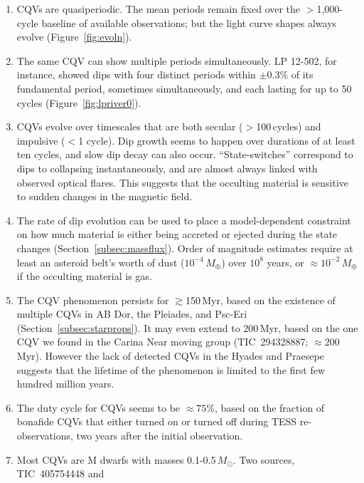 \documentclass[11pt,twocolumn,tighten]{aastex63}
\begin{document}
\begin{enumerate}[leftmargin=*]
    \item CQVs are quasiperiodic.  The mean periods remain fixed over
      the $>$1{,}000-cycle baseline of available observations; but the
      light curve shapes always evolve (Figure~\ref{fig:evoln}).
    \item The same CQV can show multiple periods simultaneously.  LP
      12-502, for instance, showed dips with four distinct periods
      within $\pm 0.3\%$ of its fundamental period, sometimes
      simultaneously, and each lasting for up to 50 cycles
      (Figure~\ref{fig:lpriver0}).
    \item CQVs evolve over timescales that are both secular
      ($>$100\,cycles) and impulsive ($<$1 cycle).  Dip growth seems
      to happen over durations of at least ten cycles, and slow dip
      decay can also occur.  ``State-switches'' correspond to dips to
      collapsing instantaneously, and are almost always linked with
      observed optical flares.  This suggests that the occulting
      material is sensitive to sudden changes in the magnetic field.
    \item The rate of dip evolution can be used to place a
      model-dependent constraint on how much material is either being
      accreted or ejected during the state changes
      (Section~\ref{subsec:massflux}).  Order of magnitude estimates
      require at least an asteroid belt's worth of dust
      ($10^{-4}$\,$M_\oplus$) over $10^8$ years, or
      $\approx$$10^{-2}$\,$M_\oplus$ if the occulting material is gas.
    \item The CQV phenomenon persists for $\gtrsim$150\,Myr, based on
      the existence of multiple CQVs in AB Dor, the Pleiades, and
      Psc-Eri (Section~\ref{subsec:starprops}).  It may even extend to
      200\,Myr, based on the one CQV we found in the Carina Near
      moving group (TIC~294328887; $\approx$200\,Myr).  However the
      lack of detected CQVs in the Hyades and Praesepe suggests that
      the lifetime of the phenomenon is limited to the first few
      hundred million years.
    \item The duty cycle for CQVs seems to be $\approx$$75$\%, based
      on the fraction of bonafide CQVs that either turned on or turned
      off during TESS re-observations, two years after the initial
      observation.
    \item Most CQVs are M dwarfs with masses
      0.1-0.5\,$M_\odot$.  Two sources, TIC~405754448 and

\end{enumerate}
\end{document}
